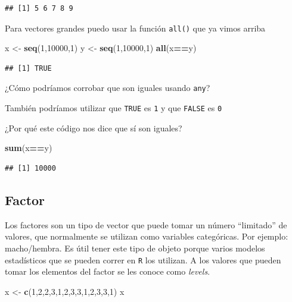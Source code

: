 \documentclass[
]{book}
\newenvironment{Shaded}{\begin{snugshade}}{\end{snugshade}}
\newcommand{\DecValTok}[1]{\textcolor[rgb]{0.00,0.00,0.81}{#1}}
\newcommand{\FunctionTok}[1]{\textcolor[rgb]{0.13,0.29,0.53}{\textbf{#1}}}
\newcommand{\NormalTok}[1]{#1}
\newcommand{\OtherTok}[1]{\textcolor[rgb]{0.56,0.35,0.01}{#1}}
\newcommand{\SpecialCharTok}[1]{\textcolor[rgb]{0.81,0.36,0.00}{\textbf{#1}}}
\begin{document}
\begin{verbatim}
## [1] 5 6 7 8 9
\end{verbatim}

Para vectores grandes puedo usar la función \texttt{all()} que ya vimos arriba

\begin{Shaded}
\begin{Highlighting}[]
\NormalTok{x }\OtherTok{\textless{}{-}} \FunctionTok{seq}\NormalTok{(}\DecValTok{1}\NormalTok{,}\DecValTok{10000}\NormalTok{,}\DecValTok{1}\NormalTok{)}
\NormalTok{y }\OtherTok{\textless{}{-}} \FunctionTok{seq}\NormalTok{(}\DecValTok{1}\NormalTok{,}\DecValTok{10000}\NormalTok{,}\DecValTok{1}\NormalTok{)}
\FunctionTok{all}\NormalTok{(x}\SpecialCharTok{==}\NormalTok{y)}
\end{Highlighting}
\end{Shaded}

\begin{verbatim}
## [1] TRUE
\end{verbatim}

¿Cómo podríamos corrobar que son iguales usando \texttt{any}?

También podríamos utilizar que \texttt{TRUE} es \texttt{1} y que \texttt{FALSE} es \texttt{0}

¿Por qué este código nos dice que sí son iguales?

\begin{Shaded}
\begin{Highlighting}[]
\FunctionTok{sum}\NormalTok{(x}\SpecialCharTok{==}\NormalTok{y)}
\end{Highlighting}
\end{Shaded}

\begin{verbatim}
## [1] 10000
\end{verbatim}

\subsection{Factor}\label{factor}

Los factores son un tipo de vector que puede tomar un número ``limitado'' de valores, que normalmente se utilizan como variables categóricas. Por ejemplo: macho/hembra. Es útil tener este tipo de objeto porque varios modelos estadísticos que se pueden correr en \texttt{R} los utilizan. A los valores que pueden tomar los elementos del factor se les conoce como \emph{levels}.

\begin{Shaded}
\begin{Highlighting}[]
\NormalTok{x }\OtherTok{\textless{}{-}} \FunctionTok{c}\NormalTok{(}\DecValTok{1}\NormalTok{,}\DecValTok{2}\NormalTok{,}\DecValTok{2}\NormalTok{,}\DecValTok{3}\NormalTok{,}\DecValTok{1}\NormalTok{,}\DecValTok{2}\NormalTok{,}\DecValTok{3}\NormalTok{,}\DecValTok{3}\NormalTok{,}\DecValTok{1}\NormalTok{,}\DecValTok{2}\NormalTok{,}\DecValTok{3}\NormalTok{,}\DecValTok{3}\NormalTok{,}\DecValTok{1}\NormalTok{)}
\NormalTok{x}
\end{Highlighting}
\end{Shaded}
\end{document}
